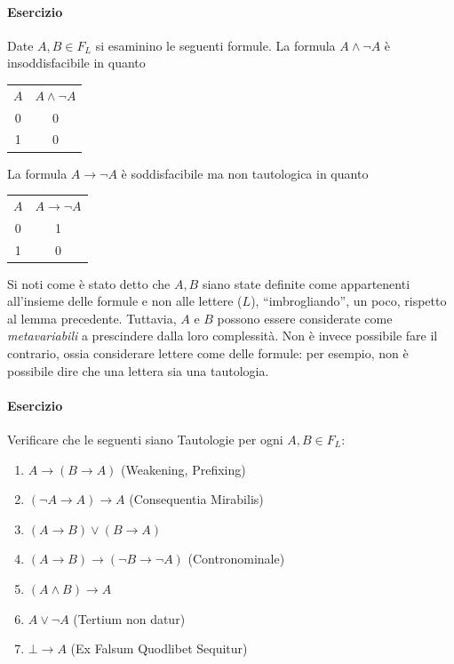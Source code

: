\paragraph{Esercizio}
Date $A, B \in F_L$ si esaminino le seguenti formule. 
La formula $A \land \neg A$ è insoddisfacibile in quanto 
\begin{table}[!h]
  \centering
  \begin{tabular}{|c|c|}
  \hline
  $A$ & $A \land \neg A$ \\
   0  &   0        \\ 
   1  &  0         \\
   \hline
 \end{tabular}
\end{table}

La formula $A \rightarrow \neg A$ è soddisfacibile ma non tautologica 
in quanto 
\begin{table}[!h]
  \centering
  \begin{tabular}{|c|c|}
    \hline 
    $A$ & $A \rightarrow \neg A$\\
     0 &   1 \\
     1 &  0 \\
     \hline
  \end{tabular}
\end{table}

Si noti come è stato detto che $A,B$ siano state definite come appartenenti 
all'insieme delle formule e non alle lettere ($L$), ``imbrogliando'', un poco, 
rispetto al lemma precedente. Tuttavia, $A$ e $B$ possono essere considerate 
come \textit{metavariabili} a prescindere dalla loro complessità. Non è invece 
possibile fare il contrario, ossia considerare lettere come delle formule: 
per esempio, non è possibile dire che una lettera sia una tautologia. 

\paragraph{Esercizio}
Verificare che le seguenti siano Tautologie per ogni $A,B \in F_L$:
\begin{enumerate}
  \item $A \rightarrow (B \rightarrow A)$ (Weakening, Prefixing)
  \item $(\neg A \rightarrow A) \rightarrow A$ (Consequentia Mirabilis)
  \item $(A \rightarrow B) \lor (B \rightarrow A)$ 
  \item $(A \rightarrow B) \rightarrow (\neg B \rightarrow \neg A)$ (Contronominale)
  \item $(A \land B) \rightarrow A$
  \item $A \lor \neg A$  (Tertium non datur)
  \item $\bot \rightarrow A$ (Ex Falsum Quodlibet Sequitur)
\end{enumerate}

